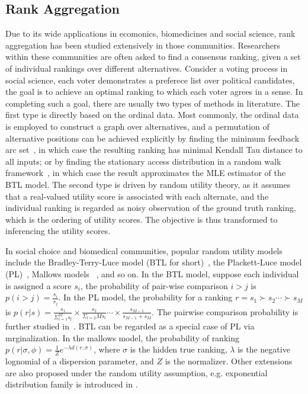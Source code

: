 \documentclass[sigconf]{acmart}
\begin{document}
\subsection{Rank Aggregation}
Due to its wide applications in ecomonics, biomedicines and social science, rank aggregation has been studied extensively in those communities. Researchers within these communities are often asked to find a consensus ranking, given a set of individual rankings over different alternatives. Consider a voting process in social science, each voter demonstrates a preferece list over political candidates, the goal is to achieve an optimal ranking to which each voter agrees in a sense.  In completing such a goal, there are usually two types of methods in literature. The first type is directly based on the ordinal data. Most commonly, the ordinal data is employed to construct a graph over alternatives, and a permutation of alternative positions can be achieved explicitly by finding the minimum feedback arc set~\cite{Alon2006Ranking}, in which case the resulting ranking has minimal Kendall Tau distance to all inputs; or by finding the stationary access distribution in a random walk framework~\cite{Negahban2012Iterative}, in which case the result approximates the MLE estimator of the BTL model. The second type is driven by random utility theory, as it assumes that a real-valued utility score is associated with each alternate, and the individual ranking is regarded as noisy observation of the ground truth ranking, which is the ordering of utility scores. The objective is thus transformed to inferencing the utility scores.         

In social choice and biomedical communities, popular random utility models include the Bradley-Terry-Luce model (BTL for short)~\cite{Hunter2004MM}, the Plackett-Luce model (PL)~\cite{AzariSoufiani2013Generalized}, Mallows models ~\cite{Lu2011Learning}, and so on. In the BTL model, suppose each individual is assigned a score $s_i$, the probability of pair-wise comparison $i>j$ is $p(i>j)=\frac{s_i}{s_j}$. In the PL model, the probability for a ranking $r=s_1 \succ s_2 \cdots \succ s_M$ is $ p(r|s)=\frac{s_1}{\Sigma_{l=1}^{M} s_l} \times \frac{s_2}{\Sigma_{l=2}{M} s_l} \cdots \times \frac{s_{M-1}}{s_{M-1}+s_{M}}$. The pairwise comparison probability is further studied in~\cite{Gleich2011Rank}. BTL can be regarded as a special case of PL via mrginalization. In the mallows model, the probability of ranking $p(r|\sigma,\phi)=\frac{1}{Z} e^{-\lambda d(r,\sigma)}$, where $\sigma$ is the hidden true ranking, $\lambda$ is the negative lognomial of a dispersion parameter, and $Z$ is the normalizer. Other extensions are also proposed under the random utility assumption, e.g. exponential distribution family is introduced in \cite{Parkes2012Random}.
\end{document}
